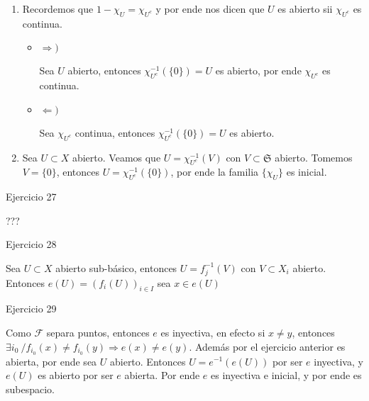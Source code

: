 \documentclass[11pt]{article}
\newcommand{\sett}[1]{\{#1\}}
\newenvironment{proof}[1][Demostraci\'on]{\begin{trivlist}
\item[\hskip \labelsep {\bfseries #1}]}{\end{trivlist}}
\newcommand{\qed}{\nobreak \ifvmode \relax \else
      \ifdim\lastskip<1.5em \hskip-\lastskip
      \hskip1.5em plus0em minus0.5em \fi \nobreak
      \vrule height0.75em width0.5em depth0.25em\fi}
\begin{document}
\begin{enumerate}
\begin{proof}
\begin{enumerate}
\item Recordemos 	que $1 - \chi_U = \chi_{U^{c}}$ y por ende nos dicen que $U$ es abierto sii $\chi_{U^{c}}$ es continua. 

\begin{itemize}

\item {$\Longrightarrow)$}

Sea $U$ abierto, entonces $\chi_{U^c}^{-1}(\sett{0}) = U$ es abierto, por ende $\chi_{U^c}$ es continua.

\item {$\Longleftarrow)$}

Sea $\chi_{U^c}$ continua, entonces $\chi_{U^c}^{-1}(\sett{0}) = U$ es abierto.

\end{itemize}

\item Sea $U \subset X$ abierto. Veamos que $U = \chi_{U^c}^{-1}(V)$ con $V \subset \mathfrak{S}$ abierto. Tomemos $V = \sett{0}$, entonces $U = \chi_{U^c}^{-1}( \sett{0})$, por ende la familia $\sett{\chi_U}$ es inicial.

\end{enumerate}

\end{proof}

\item {Ejercicio 27}

\begin{proof}
???
\end{proof}

\item {Ejercicio 28}

\begin{proof}
Sea $U \subset X$ abierto sub-b\'asico, entonces $U = f_j ^{-1}(V)$ con $V \subset X_i$ abierto. Entonces $e(U) = (f_i(U))_{i \in I}$ sea $x \in e(U)$
\end{proof}

\item {Ejercicio 29}

\begin{proof}

Como $\mathcal{F}$ separa puntos, entonces $e$ es inyectiva, en efecto si $x \neq y$, entonces $\exists i_0 \ / f_{i_0}(x) \neq f_{i_0}(y) \Longrightarrow e(x) \neq e(y)$. Adem\'as por el ejercicio anterior es abierta, por ende sea $U$ abierto. Entonces $U = e^{-1}(e(U))$ por ser $e$ inyectiva, y $e(U)$ es abierto por ser $e$ abierta. Por ende $e$ es inyectiva e inicial, y por ende es subespacio. \qed


\end{proof}
\end{enumerate}
\end{document}
